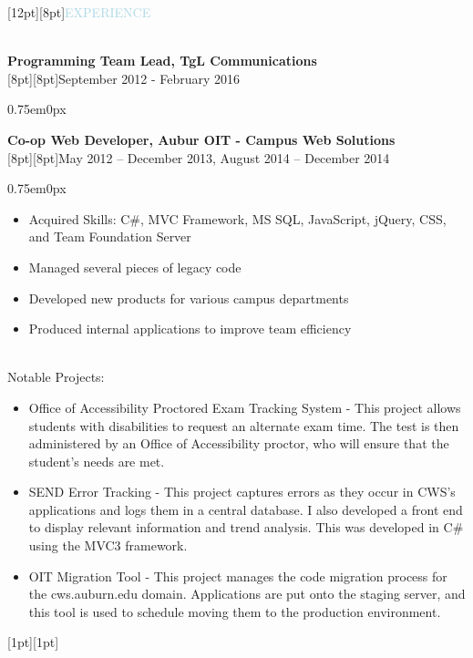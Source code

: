\documentclass{res}
\newenvironment{ResumeBlock}[1]
{
	\begin{normalsize}
		\raisebox{0pt}[12pt][8pt]{\textcolor{lightblue}{#1}}
	\end{normalsize}
	\\
}
{	
}
\newenvironment{DetailsBlock}[2]
{
	\textbf{\color{darkfont}#1}
	\\
	\raisebox{0pt}[8pt][8pt]{#2}
	\begin{adjustwidth}{0.75em}{0px}
}
{	
	\end{adjustwidth}
}
\begin{document}
\begin{ResumeBlock}{EXPERIENCE}
\begin{DetailsBlock}{Programming Team Lead, TgL Communications}{September 2012 - February 2016}
\begin{itemize}
			\end{itemize}
		\end{DetailsBlock}		
		\begin{DetailsBlock}{Co-op Web Developer, Aubur OIT - Campus Web Solutions}{May 2012 – December 2013, August 2014 – December 2014 }
			\begin{itemize}
				\item Acquired Skills:  C\#, MVC Framework, MS SQL, JavaScript, jQuery, CSS, and Team Foundation Server 
				\item Managed several pieces of legacy code
				\item Developed new products for various campus departments 
				\item Produced internal applications to improve team efficiency 
			\end{itemize}
			~\\
			Notable Projects:
			\begin{itemize}
				\item Office of Accessibility Proctored Exam Tracking System - This project allows students with disabilities to request an alternate exam time.  The test is then administered by an Office of Accessibility proctor, who will ensure that the student’s needs are met.   
				\item SEND Error Tracking - This project captures errors as they occur in CWS's applications and logs them in a central database.  I also developed a front end to display relevant information and trend analysis.  This was developed in C\# using the MVC3 framework. 
				\item OIT Migration Tool - This project manages the code migration process for the cws.auburn.edu domain.  Applications are put onto the staging server, and this tool is used to schedule moving them to the production environment. 
			\end{itemize}
			\raisebox{0pt}[1pt][1pt]{\space}
		\end{DetailsBlock}
	\end{ResumeBlock}	
	\\\hline
\end{document}
